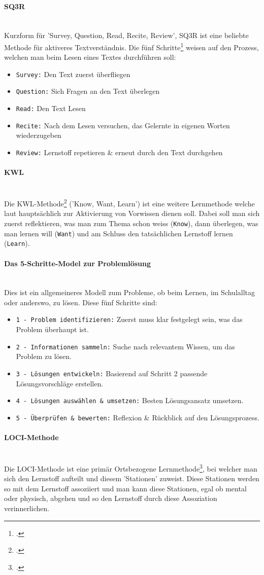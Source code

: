 \documentclass[12pt,a4paper]{report}
\newcommand{\myparagraph}[1]{\paragraph{#1}\mbox{}\\}
\begin{document}
\myparagraph{SQ3R}
Kurzform für 'Survey, Question, Read, Recite, Review', SQ3R ist eine beliebte Methode für aktiveres Textverständnis. Die fünf Schritte\footcite{SQ3R} weisen auf den Prozess, welchen man beim Lesen eines Textes durchführen soll:
\begin{itemize}
    \item \texttt{Survey:} Den Text zuerst überfliegen
    \item \texttt{Question:} Sich Fragen an den Text überlegen
    \item \texttt{Read:} Den Text Lesen
    \item \texttt{Recite:} Nach dem Lesen versuchen, das Gelernte in eigenen Worten wiederzugeben
    \item \texttt{Review:} Lernstoff repetieren \& erneut durch den Text durchgehen
\end{itemize}

\myparagraph{KWL}
Die KWL-Methode\footcite{SQ3R} ('Know, Want, Learn') ist eine weitere Lernmethode welche laut \textcite{SQ3R} hauptsächlich zur Aktivierung von Vorwissen dienen soll. 
Dabei soll man sich zuerst reflektieren, was man zum Thema schon weiss (\texttt{Know}), dann überlegen, was man lernen will (\texttt{Want}) und am Schluss den tatsächlichen Lernstoff lernen (\texttt{Learn}).

\myparagraph{Das 5-Schritte-Model zur Problemlösung}
Dies ist ein allgemeineres Modell zum Probleme, ob beim Lernen, im Schulalltag oder anderswo, zu lösen. Diese fünf Schritte sind:
\begin{itemize}
    \item \texttt{1 - Problem identifizieren:} Zuerst muss klar festgelegt sein, was das Problem überhaupt ist.
    \item \texttt{2 - Informationen sammeln:} Suche nach relevantem Wissen, um das Problem zu lösen.
    \item \texttt{3 - Lösungen entwickeln:} Basierend auf Schritt 2 passende Lösungsvorschläge erstellen.
    \item \texttt{4 - Lösungen auswählen \& umsetzen:} Besten Lösungsansatz umsetzen.
    \item \texttt{5 - Überprüfen \& bewerten:} Reflexion \& Rückblick auf den Lösungsprozess.
\end{itemize}

\myparagraph{LOCI-Methode}
Die LOCI-Methode ist eine primär Ortsbezogene Lernmethode\footcite{SQ3R}, bei welcher man sich den Lernstoff aufteilt und diesem 'Stationen' zuweist.
Diese Stationen werden so mit dem Lernstoff assoziiert und man kann diese Stationen, egal ob mental oder physisch, abgehen und so den Lernstoff durch diese Assoziation verinnerlichen.
\end{document}
